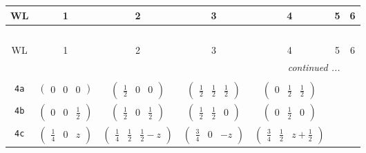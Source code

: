 \documentclass[fleqn,9pt,landscape]{jsarticle}
\begin{document}
\begin{center}
\renewcommand{\arraystretch}{1.2}
\begin{longtable}{ccccccc}
 \hline \hline
WL & 1 & 2 & 3 & 4 & 5 & 6 \\ \hline \endfirsthead

\multicolumn{6}{l}{\tablename\ \thetable{}} \\
 \hline \hline
WL & 1 & 2 & 3 & 4 & 5 & 6 \\ \hline \endhead

 \hline \hline
\multicolumn{6}{r}{\footnotesize\it continued ...} \\ \endfoot

 \hline \hline
\multicolumn{6}{r}{} \\ \endlastfoot

{\tt 4a} & $ \begin{pmatrix} 0 & 0 & 0 \end{pmatrix} $ & $ \begin{pmatrix} \frac{1}{2} & 0 & 0 \end{pmatrix} $ & $ \begin{pmatrix} \frac{1}{2} & \frac{1}{2} & \frac{1}{2} \end{pmatrix} $ & $ \begin{pmatrix} 0 & \frac{1}{2} & \frac{1}{2} \end{pmatrix} $ & $  $ & $  $ \\ \hline
{\tt 4b} & $ \begin{pmatrix} 0 & 0 & \frac{1}{2} \end{pmatrix} $ & $ \begin{pmatrix} \frac{1}{2} & 0 & \frac{1}{2} \end{pmatrix} $ & $ \begin{pmatrix} \frac{1}{2} & \frac{1}{2} & 0 \end{pmatrix} $ & $ \begin{pmatrix} 0 & \frac{1}{2} & 0 \end{pmatrix} $ & $  $ & $  $ \\ \hline
{\tt 4c} & $ \begin{pmatrix} \frac{1}{4} & 0 & z \end{pmatrix} $ & $ \begin{pmatrix} \frac{1}{4} & \frac{1}{2} & \frac{1}{2} - z \end{pmatrix} $ & $ \begin{pmatrix} \frac{3}{4} & 0 & - z \end{pmatrix} $ & $ \begin{pmatrix} \frac{3}{4} & \frac{1}{2} & z + \frac{1}{2} \end{pmatrix} $ & $  $ & $  $ \\ \hline

\end{longtable}
\end{center}
\end{document}
